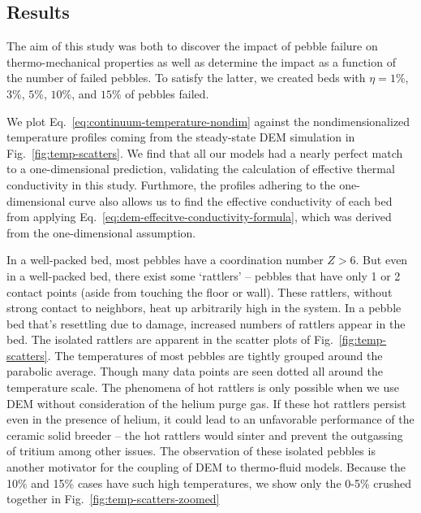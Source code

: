 \subsection{Results}
The aim of this study was both to discover the impact of pebble failure on thermo-mechanical properties as well as determine the impact as a function of the number of failed pebbles. To satisfy the latter, we created beds with $\eta = 1\%$, $3\%$, $5\%$, $10\%$, and $15\%$ of pebbles failed. 

We plot Eq.~\ref{eq:continuum-temperature-nondim} against the nondimensionalized temperature profiles coming from the steady-state DEM simulation in Fig.~\ref{fig:temp-scatters}. We find that all our models had a nearly perfect match to a one-dimensional prediction, validating the calculation of effective thermal conductivity in this study. Furthmore, the profiles adhering to the one-dimensional curve also allows us to find the effective conductivity of each bed from applying Eq.~\ref{eq:dem-effecitve-conductivity-formula}, which was derived from the one-dimensional assumption.

In a well-packed bed, most pebbles have a coordination number $Z > 6$. But even in a well-packed bed, there exist some `rattlers' -- pebbles that have only 1 or 2 contact points (aside from touching the floor or wall). These rattlers, without strong contact to neighbors, heat up arbitrarily high in the system. In a pebble bed that's resettling due to damage, increased numbers of rattlers appear in the bed. The isolated rattlers are apparent in the scatter plots of Fig.~\ref{fig:temp-scatters}. The temperatures of most pebbles are tightly grouped around the parabolic average. Though many data points are seen dotted all around the temperature scale. The phenomena of hot rattlers is only possible when we use DEM without consideration of the helium purge gas. If these hot rattlers persist even in the presence of helium, it could lead to an unfavorable performance of the ceramic solid breeder -- the hot rattlers would sinter and prevent the outgassing of tritium among other issues. The observation of these isolated pebbles is another motivator for the coupling of DEM to thermo-fluid models. Because the 10\% and 15\% cases have such high temperatures, we show only the 0-5\% crushed together in Fig.~\ref{fig:temp-scatters-zoomed}

